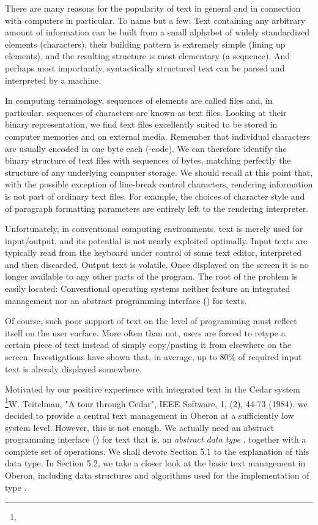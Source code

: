 There are many reasons for the popularity of text in general and in
connection with computers in particular. To name but a few: Text
containing any arbitrary amount of information can be built from a
small alphabet of widely standardized elements (characters), their
building pattern is extremely simple (lining up elements), and the
resulting structure is most elementary (a sequence). And perhaps most
importantly, syntactically structured text can be parsed and
interpreted by a machine.

In computing terminology, sequences of elements are called files and,
in particular, sequences of characters are known as text
files. Looking at their binary representation, we find text files
excellently suited to be stored in computer memories and on external
media. Remember that individual characters are usually encoded in one
byte each (-code). We can therefore identify the binary structure
of text files with sequences of bytes, matching perfectly the
structure of any underlying computer storage. We should recall at this
point that, with the possible exception of line-break control
characters, rendering information is not part of ordinary text
files. For example, the choices of character style and of paragraph
formatting parameters are entirely left to the rendering interpreter.

Unfortunately, in conventional computing environments, text is merely
used for input/output, and its potential is not nearly exploited
optimally. Input texts are typically read from the keyboard under
control of some text editor, interpreted and then discarded. Output
text is volatile. Once displayed on the screen it is no longer
available to any other parts of the program. The root of the problem
is easily located: Conventional operating systems neither feature an
integrated management nor an abstract programming interface () for
texts.

Of course, such poor support of text on the level of programming must
reflect itself on the user surface. More often than not, users are
forced to retype a certain piece of text instead of simply
copy/pasting it from elsewhere on the screen. Investigations have
shown that, in average, up to 80\% of required input text is already
displayed somewhere.

Motivated by our positive experience with integrated text in the Cedar
system \footnote{{\mc[1]}}{W. Teitelman, "A tour through Cedar", IEEE Software, 1, (2), 44-73 (1984).} we decided to provide a central text management in
Oberon at a sufficiently low system level. However, this is not
enough. We actually need an abstract programming interface () for
text that is, an \emph{abstract data type} , together with a complete set
of operations. We shall devote Section 5.1 to the explanation of this
data type. In Section 5.2, we take a closer look at the basic text
management in Oberon, including data structures and algorithms used
for the implementation of type .

